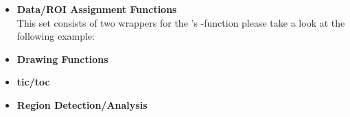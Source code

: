 \begin{itemize}
\item \textbf{Data/ROI Assignment Functions}\\
This set consists of two wrappers for the 's -function please take a look at the following example:


\item \textbf{Drawing Functions}\\
\item \textbf{tic/toc}\\
\item \textbf{Region Detection/Analysis}\\
\end{itemize}


